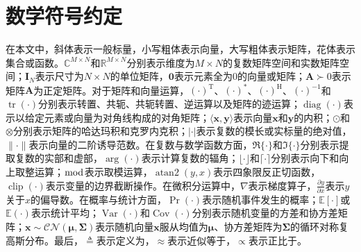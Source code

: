 \chapter{数学符号约定}\label{app:notations}

在本文中，斜体表示一般标量，小写粗体表示向量，大写粗体表示矩阵，花体表示集合或函数。$\mathbb{C}^{M \times N}$和$\mathbb{R}^{M \times N}$分别表示维度为$M \times N$的复数矩阵空间和实数矩阵空间；$\bm{I}_N$表示尺寸为$N \times N$的单位矩阵，$\bm{0}$表示元素全为$0$的向量或矩阵；$\bm{A} \succ 0$表示矩阵$\bm{A}$为正定矩阵。对于矩阵和向量运算，$(\cdot)^\mathrm{T}$、$(\cdot)^\ast$、$(\cdot)^\mathrm{H}$、$(\cdot)^{-1}$和$\operatorname{tr}(\cdot)$分别表示转置、共轭、共轭转置、逆运算以及矩阵的迹运算；$\operatorname{diag}(\cdot)$表示以给定元素或向量为对角线构成的对角矩阵；$\langle \bm{x}, \bm{y} \rangle$表示向量$\bm{x}$和$\bm{y}$的内积；$\odot$和$\otimes$分别表示矩阵的哈达玛积和克罗内克积；$|\cdot|$表示复数的模长或实标量的绝对值，$\|\cdot\|$表示向量的二阶诱导范数。在复数与数学函数方面，$\Re\{\cdot\}$和$\Im\{\cdot\}$分别表示提取复数的实部和虚部，$\arg(\cdot)$表示计算复数的辐角；$\lfloor \cdot \rfloor$和$\lceil \cdot \rceil$分别表示向下和向上取整运算；$\bmod$表示取模运算，$\operatorname{atan2}(y, x)$表示四象限反正切函数，$\operatorname{clip}(\cdot)$表示变量的边界截断操作。在微积分运算中，$\nabla$表示梯度算子，$\frac{\partial y}{\partial x}$表示$y$关于$x$的偏导数。在概率与统计方面，$\operatorname{Pr}(\cdot)$表示随机事件发生的概率；$\mathbb{E}[\cdot]$或$\mathbb{E}(\cdot)$表示统计平均；$\operatorname{Var}(\cdot)$和$\operatorname{Cov}(\cdot)$分别表示随机变量的方差和协方差矩阵；$\bm{x} \sim \mathcal{CN}(\bm{\mu}, \bm{\Sigma})$表示随机向量$\bm{x}$服从均值为$\bm{\mu}$、协方差矩阵为$\bm{\Sigma}$的循环对称复高斯分布。最后，$\triangleq$表示定义为，$\approx$表示近似等于，$\propto$表示正比于。

